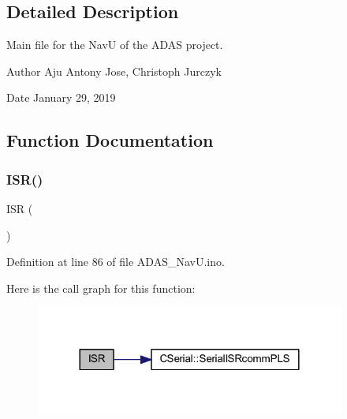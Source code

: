 \subsection{Detailed Description}
Main file for the NavU of the A\+D\+AS project. 

\begin{DoxyAuthor}{Author}
Aju Antony Jose, Christoph Jurczyk 
\end{DoxyAuthor}
\begin{DoxyDate}{Date}
January 29, 2019 
\end{DoxyDate}


\subsection{Function Documentation}
\mbox{\label{_a_d_a_s___nav_u_8ino_ae6e8a8009a9ae0c59f25a496d1cf5a84}} 
\subsubsection{\texorpdfstring{ISR()}{ISR()}\hspace{0.1cm}{\footnotesize\ttfamily [1/2]}}
{\footnotesize\ttfamily I\+SR (\begin{DoxyParamCaption}\item[{U\+S\+A\+R\+T1\+\_\+\+R\+X\+\_\+vect}]{ }\end{DoxyParamCaption})}



Definition at line 86 of file A\+D\+A\+S\+\_\+\+Nav\+U.\+ino.

Here is the call graph for this function\+:
\nopagebreak
\begin{figure}[H]
\begin{center}
\leavevmode
\includegraphics[width=288pt]{_a_d_a_s___nav_u_8ino_ae6e8a8009a9ae0c59f25a496d1cf5a84_cgraph}
\end{center}
\end{figure}
\mbox{\label{_a_d_a_s___nav_u_8ino_a63a86aad9ba2e355fe6380da553f554e}} 

